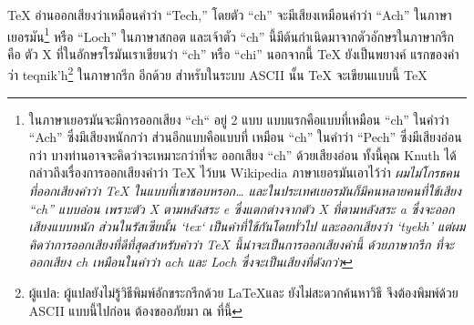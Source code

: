 \TeX{} อ่านออกเสียงว่าเหมือนคำว่า ``Tech,'' โดยตัว ``ch'' จะมีเสียงเหมือนคำว่า
``Ach'' ในภาษาเยอรมัน\footnote{ในภาษาเยอรมันจะมีการออกเสียง ``ch`` อยู่ 2 แบบ
แบบแรกคือแบบที่เหมือน ``ch'' ในคำว่า ``Ach'' ซึ่งมีเสียงหนักกว่า ส่วนอีกแบบคือแบบที่%
เหมือน ``ch'' ในคำว่า ``Pech'' ซึ่งมีเสียงอ่อนกว่า บางท่านอาจจะคิดว่าจะเหมาะกว่าที่จะ%
ออกเสียง ``ch'' ด้วยเสียงอ่อน ทั้งนี้คุณ Knuth ได้กล่าวถึงเรื่องการออกเสียงคำว่า \TeX{}
ไว้บน Wikipedia ภาษาเยอรมันเอาไว้ว่า \emph{ผมไม่โกรธคนที่ออกเสียงคำว่า \TeX{}
ในแบบที่เขาชอบหรอก\ldots{} และในประเทศเยอรมันก็มีคนหลายคนที่ใช้เสียง ``ch''
แบบอ่อน เพราะตัว X ตามหลังสระ e ซึ่งแตกต่างจากตัว X ที่ตามหลังสระ a
ซึ่งจะออกเสียงแบบหนัก ส่วนในรัสเซียนั้น `tex` เป็นคำที่ใช้กันโดยทั่วไป และออกเสียงว่า
`tyekh' แต่ผมคิดว่าการออกเสียงที่ดีที่สุดสำหรับคำว่า \TeX{} นี้น่าจะเป็นการออกเสียงคำนี้%
ด้วยภาษากรีก ที่จะออกเสียง ch เหมือนในคำว่า ach และ Loch ซึ่งจะเป็นเสียงที่ดังกว่า}}
หรือ ``Loch'' ในภาษาสกอต และเจ้าตัว ``ch'' นี้มีต้นกำเนิดมาจากตัวอักษรในภาษากรีก คือ
ตัว X ที่ในอักษรโรมันเราเขียนว่า ``ch'' หรือ ``chi'' นอกจากนี้ \TeX{} ยังเป็นพยางค์%
แรกของคำว่า teqnik'h\footnote{ผู้แปล: ผู้แปลยังไม่รู้วิธีพิมพ์อักขระกรีกด้วย \LaTeX และ
ยังไม่สะดวกค้นหาวิธี จึงต้องพิมพ์ด้วย ASCII แบบนี้ไปก่อน ต้องขออภัยมา ณ ที่นี้} ในภาษากรีก%
อีกด้วย สำหรับในระบบ ASCII นั้น \TeX{} จะเขียนแบบนี้ TeX

\shbtoaddmoretranslation
